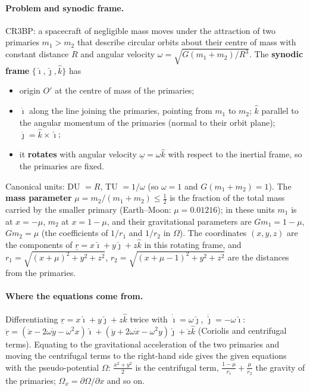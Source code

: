 \answer
\paragraph{Problem and synodic frame.} CR3BP: a spacecraft of negligible mass moves under the attraction of two primaries
$m_1>m_2$ that describe circular orbits about their centre of mass with constant distance $R$ and angular velocity
$\omega=\sqrt{G(m_1+m_2)/R^3}$. The \textbf{synodic frame} $\{\hat\imath,\hat\jmath,\hat k\}$ has
\begin{itemize}
\item origin $O'$ at the centre of mass of the primaries;
\item $\hat\imath$ along the line joining the primaries, pointing from $m_1$ to $m_2$; $\hat k$ parallel to the angular momentum of the
primaries (normal to their orbit plane); $\hat\jmath=\hat k\times\hat\imath$;
\item it \textbf{rotates} with angular velocity $\underline\omega=\omega\hat k$ with respect to the inertial frame, so the primaries are fixed.
\end{itemize}
Canonical units: DU $=R$, TU $=1/\omega$ (so $\omega=1$ and $G(m_1+m_2)=1$). The \textbf{mass parameter}
$\mu=m_2/(m_1+m_2)\le\frac12$ is the fraction of the total mass carried by the smaller primary (Earth--Moon: $\mu=0.01216$); in
these units $m_1$ is at $x=-\mu$, $m_2$ at $x=1-\mu$, and their gravitational parameters are $Gm_1=1-\mu$, $Gm_2=\mu$ (the
coefficients of $1/r_1$ and $1/r_2$ in $\Omega$). The coordinates $(x,y,z)$ are the components of $\underline r=x\hat\imath+y\hat\jmath+z\hat k$ in this rotating frame, and
$r_1=\sqrt{(x+\mu)^2+y^2+z^2}$, $r_2=\sqrt{(x+\mu-1)^2+y^2+z^2}$ are the distances from the primaries.

\paragraph{Where the equations come from.} Differentiating $\underline r=x\hat\imath+y\hat\jmath+z\hat k$ twice with
$\dot{\hat\imath}=\omega\hat\jmath$, $\dot{\hat\jmath}=-\omega\hat\imath$:
$\ddot{\underline r}=(\ddot x-2\omega\dot y-\omega^2x)\hat\imath+(\ddot y+2\omega\dot x-\omega^2y)\hat\jmath+\ddot z\hat k$
(Coriolis and centrifugal terms). Equating to the gravitational acceleration of the two primaries and moving the centrifugal terms
to the right-hand side gives the given equations with the pseudo-potential $\Omega$: $\frac{x^2+y^2}{2}$ is the centrifugal
term, $\frac{1-\mu}{r_1}+\frac{\mu}{r_2}$ the gravity of the primaries; $\Omega_x=\partial\Omega/\partial x$ and so on.

